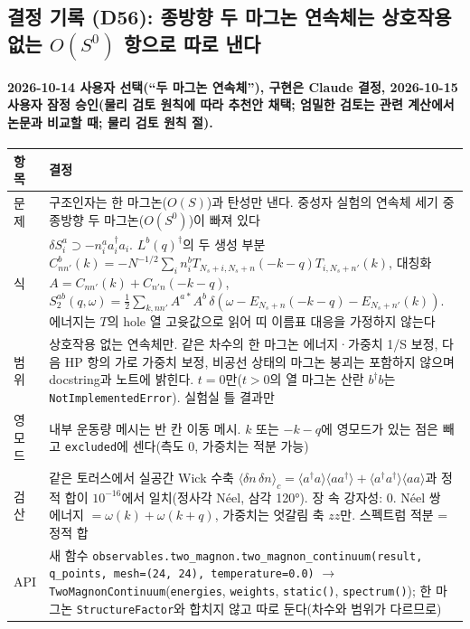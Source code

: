 \subsection{결정 기록 (D56): 종방향 두 마그논 연속체는 상호작용 없는 $O(S^0)$ 항으로 따로 낸다}\label{decisions-d56-two-magnon}
\begingroup%
  \framesubtitle{2026-10-14 사용자 선택(``두 마그논 연속체''), 구현은 Claude 결정, 2026-10-15 사용자 잠정 승인(물리 검토 원칙에 따라 추천안 채택; 엄밀한 검토는 관련 계산에서 논문과 비교할 때; 물리 검토 원칙 절).}
  \small\renewcommand{\arraystretch}{1.12}
  \begin{tabularx}{\textwidth}{@{}P{3.0cm}Y@{}}
    \toprule
    항목 & 결정 \\
    \midrule
    문제 & 구조인자는 한 마그논($O(S)$)과 탄성만 낸다. 중성자 실험의 연속체 세기 중 종방향 두 마그논($O(S^0)$)이 빠져 있다 \\
    식 & $\delta S_i^a\supset-n_i^a a_i^\dagger a_i$. $L^b(q)^\dagger$의 두 생성 부분 $C^b_{nn'}(k)=-N^{-1/2}\sum_i n_i^b T_{N_s+i,N_s+n}(-k-q)T_{i,N_s+n'}(k)$, 대칭화 $A=C_{nn'}(k)+C_{n'n}(-k-q)$, $S_2^{ab}(q,\omega)=\tfrac12\sum_{k,nn'}A^{a*}A^b\,\delta(\omega-E_{N_s+n}(-k-q)-E_{N_s+n'}(k))$. 에너지는 $T$의 hole 열 고윳값으로 읽어 띠 이름표 대응을 가정하지 않는다 \\
    범위 & 상호작용 없는 연속체만. 같은 차수의 한 마그논 에너지·가중치 1/S 보정, 다음 HP 항의 가로 가중치 보정, 비공선 상태의 마그논 붕괴는 포함하지 않으며 docstring과 노트에 밝힌다. $t=0$만($t>0$의 열 마그논 산란 $b^\dagger b$는 \texttt{NotImplementedError}). 실험실 틀 결과만 \\
    영모드 & 내부 운동량 메시는 반 칸 이동 메시. $k$ 또는 $-k-q$에 영모드가 있는 점은 빼고 \texttt{excluded}에 센다(측도 0, 가중치는 적분 가능) \\
    검산 & 같은 토러스에서 실공간 Wick 수축 $\langle\delta n\,\delta n\rangle_c=\langle a^\dagger a\rangle\langle aa^\dagger\rangle+\langle a^\dagger a^\dagger\rangle\langle aa\rangle$과 정적 합이 $10^{-16}$에서 일치(정사각 Néel, 삼각 120°). 장 속 강자성: 0. Néel 쌍 에너지 $=\omega(k)+\omega(k+q)$, 가중치는 엇갈림 축 $zz$만. 스펙트럼 적분 = 정적 합 \\
    API & 새 함수 \texttt{observables.two\_magnon.two\_magnon\_continuum(result, q\_points, mesh=(24, 24), temperature=0.0)} $\to$ \texttt{TwoMagnonContinuum}(\texttt{energies}, \texttt{weights}, \texttt{static()}, \texttt{spectrum()}); 한 마그논 \texttt{StructureFactor}와 합치지 않고 따로 둔다(차수와 범위가 다르므로) \\
    \bottomrule
  \end{tabularx}
\endgroup


